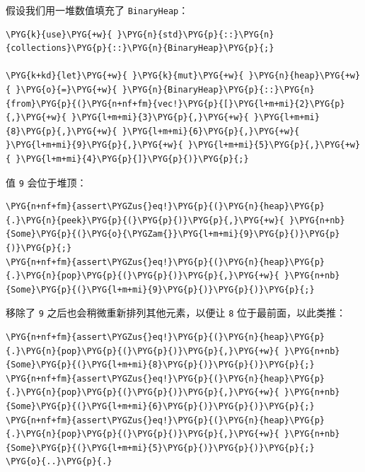 假设我们用一堆数值填充了 \texttt{BinaryHeap}：

\begin{Verbatim}[commandchars=\\\{\},breaklines=true,breakanywhere=true,fontsize=\codefont,xleftmargin=17bp]
\PYG{k}{use}\PYG{+w}{ }\PYG{n}{std}\PYG{p}{::}\PYG{n}{collections}\PYG{p}{::}\PYG{n}{BinaryHeap}\PYG{p}{;}

\PYG{k+kd}{let}\PYG{+w}{ }\PYG{k}{mut}\PYG{+w}{ }\PYG{n}{heap}\PYG{+w}{ }\PYG{o}{=}\PYG{+w}{ }\PYG{n}{BinaryHeap}\PYG{p}{::}\PYG{n}{from}\PYG{p}{(}\PYG{n+nf+fm}{vec!}\PYG{p}{[}\PYG{l+m+mi}{2}\PYG{p}{,}\PYG{+w}{ }\PYG{l+m+mi}{3}\PYG{p}{,}\PYG{+w}{ }\PYG{l+m+mi}{8}\PYG{p}{,}\PYG{+w}{ }\PYG{l+m+mi}{6}\PYG{p}{,}\PYG{+w}{ }\PYG{l+m+mi}{9}\PYG{p}{,}\PYG{+w}{ }\PYG{l+m+mi}{5}\PYG{p}{,}\PYG{+w}{ }\PYG{l+m+mi}{4}\PYG{p}{]}\PYG{p}{)}\PYG{p}{;}
\end{Verbatim}

值 \texttt{9} 会位于堆顶：

\begin{Verbatim}[commandchars=\\\{\},breaklines=true,breakanywhere=true,fontsize=\codefont,xleftmargin=17bp]
\PYG{n+nf+fm}{assert\PYGZus{}eq!}\PYG{p}{(}\PYG{n}{heap}\PYG{p}{.}\PYG{n}{peek}\PYG{p}{(}\PYG{p}{)}\PYG{p}{,}\PYG{+w}{ }\PYG{n+nb}{Some}\PYG{p}{(}\PYG{o}{\PYGZam{}}\PYG{l+m+mi}{9}\PYG{p}{)}\PYG{p}{)}\PYG{p}{;}
\PYG{n+nf+fm}{assert\PYGZus{}eq!}\PYG{p}{(}\PYG{n}{heap}\PYG{p}{.}\PYG{n}{pop}\PYG{p}{(}\PYG{p}{)}\PYG{p}{,}\PYG{+w}{ }\PYG{n+nb}{Some}\PYG{p}{(}\PYG{l+m+mi}{9}\PYG{p}{)}\PYG{p}{)}\PYG{p}{;}
\end{Verbatim}

移除了 \texttt{9} 之后也会稍微重新排列其他元素，以便让 \texttt{8} 位于最前面，以此类推：

\begin{Verbatim}[commandchars=\\\{\},breaklines=true,breakanywhere=true,fontsize=\codefont,xleftmargin=17bp]
\PYG{n+nf+fm}{assert\PYGZus{}eq!}\PYG{p}{(}\PYG{n}{heap}\PYG{p}{.}\PYG{n}{pop}\PYG{p}{(}\PYG{p}{)}\PYG{p}{,}\PYG{+w}{ }\PYG{n+nb}{Some}\PYG{p}{(}\PYG{l+m+mi}{8}\PYG{p}{)}\PYG{p}{)}\PYG{p}{;}
\PYG{n+nf+fm}{assert\PYGZus{}eq!}\PYG{p}{(}\PYG{n}{heap}\PYG{p}{.}\PYG{n}{pop}\PYG{p}{(}\PYG{p}{)}\PYG{p}{,}\PYG{+w}{ }\PYG{n+nb}{Some}\PYG{p}{(}\PYG{l+m+mi}{6}\PYG{p}{)}\PYG{p}{)}\PYG{p}{;}
\PYG{n+nf+fm}{assert\PYGZus{}eq!}\PYG{p}{(}\PYG{n}{heap}\PYG{p}{.}\PYG{n}{pop}\PYG{p}{(}\PYG{p}{)}\PYG{p}{,}\PYG{+w}{ }\PYG{n+nb}{Some}\PYG{p}{(}\PYG{l+m+mi}{5}\PYG{p}{)}\PYG{p}{)}\PYG{p}{;}
\PYG{o}{..}\PYG{p}{.}
\end{Verbatim}

